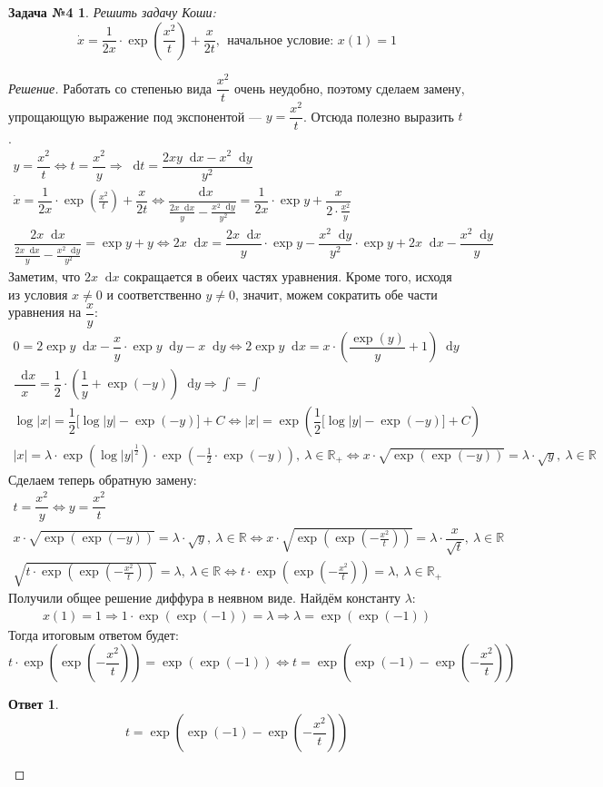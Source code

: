 \documentclass[a4paper,12pt]{article}
\newtheorem*{task4}{Задача №4}
\newtheorem*{ans}{Ответ}
\newcommand{\R}{\mathbb{R}}
\renewcommand*\d{\mathop{}\!\mathrm{d}}
\newcommand{\dx}{\dot{x}}
\newcommand{\bto}{\Longrightarrow}
\newcommand{\ds}{\displaystyle}
\begin{document}
\begin{task4}
	Решить задачу Коши:
	\[	\dx = \dfrac{1}{2x}\cdot \exp(\frac{x^2}{t}) + \dfrac{x}{2t},\ \ 	\text{начальное условие: }x(1) = 1\]
\end{task4}
\begin{proof}[Решение]
	Работать со степенью вида $\dfrac{x^2}{t}$ очень неудобно, поэтому сделаем замену, упрощающую выражение под экспонентой  --- $y = \dfrac{x^2}{t}$. Отсюда полезно выразить $t$.
	\begin{gather*}
	y = \dfrac{x^2}{t} \iff t = \dfrac{x^2}{y} \bto \d t = \dfrac{2xy\d x - x^2\d y}{y^2}\\
	\dx = \dfrac{1}{2x}\cdot \exp(\frac{x^2}{t}) + \dfrac{x}{2t} \iff \dfrac{\d x}{\frac{2x\d x}{y} - \frac{x^2\d y}{y^2}} = \dfrac{1}{2x} \cdot \exp y + \dfrac{x}{2\cdot\frac{x^2}{y}}\\
	\dfrac{2x\d x}{\frac{2x\d x}{y} - \frac{x^2\d y}{y^2}} = \exp y + y \iff 2x\d x = \dfrac{2x\d x}{y} \cdot \exp y - \dfrac{x^2\d y}{y^2} \cdot \exp y + 2x\d x - \dfrac{x^2 \d y}{y}
	\end{gather*}
	Заметим, что $2x\d x$ сокращается в обеих частях уравнения. Кроме того, исходя из условия $x \neq 0$ и соответственно $y \neq 0$, значит, можем сократить обе части уравнения на $\dfrac{x}{y}$:
	\begin{gather*}
	0 = 2\exp y \d x - \dfrac{x}{y}\cdot \exp y \d y - x\d y \iff 2\exp y \d x = x\cdot \left(\dfrac{\exp(y)}{y} + 1\right) \d y\\
	\dfrac{\d x}{x} = \dfrac{1}{2} \cdot \left(\dfrac{1}{y} + \exp(-y)\right) \d y \bto \ds\int = \int\\
	\log|x| = \dfrac{1}{2}\big[\log|y| - \exp(-y)\big] + C \iff |x| = \exp(\dfrac{1}{2}\big[\log|y| - \exp(-y)\big] + C)\\
	|x| = \lambda \cdot \exp(\log|y|^{\frac{1}{2}}) \cdot \exp(-\frac{1}{2}\cdot \exp(-y)),\ \lambda \in \R_+ \iff x\cdot \sqrt{\exp(\exp(-y))} = \lambda \cdot \sqrt{y},\ \lambda \in\R
	\end{gather*}
	Сделаем теперь обратную замену:
	\begin{gather*}
	t = \dfrac{x^2}{y} \iff y = \dfrac{x^2}{t}\\
	x \cdot \sqrt{\exp(\exp(-y))} = \lambda \cdot \sqrt{y},\ \lambda \in\R \iff x \cdot \sqrt{\exp(\exp(-\frac{x^2}{t}))} = \lambda \cdot \dfrac{x}{\sqrt{t}},\ \lambda \in \R\\
	\sqrt{t \cdot \exp(\exp(-\frac{x^2}{t}))} = \lambda,\ \lambda \in \R \iff t \cdot \exp(\exp(-\frac{x^2}{t})) = \lambda,\ \lambda \in \R_+
	\end{gather*}
	Получили общее решение диффура в неявном виде. Найдём константу $\lambda$:
	\begin{gather*}
	x(1) = 1 \bto 1 \cdot \exp(\exp(-1)) = \lambda \bto \lambda = \exp(\exp(-1))
	\end{gather*}
	Тогда итоговым ответом будет:
	\[t \cdot \exp(\exp(-\frac{x^2}{t})) = \exp(\exp(-1)) \iff t = \exp(\exp(-1) - \exp(-\dfrac{x^2}{t}))\]
	\begin{ans}
		\[t = \exp(\exp(-1) - \exp(-\dfrac{x^2}{t}))\]
	\end{ans}
\end{proof}
\end{document}
